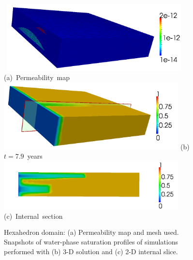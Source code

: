 \begin{figure}[h]
\vbox{
\hbox{
\hspace{-0.cm}\includegraphics[width=0.85\textwidth]{3d_perm}}
\vspace{-0.cm}\hbox{\hspace{4cm}(a) Permeability map}
\vspace{.5cm}
\hbox{
\hspace{-0.cm}\includegraphics[width=0.85\textwidth]{3d_first}}
\vspace{-0.cm}\hbox{\hspace{4cm}(b) $t= 7.9$ years }
\vspace{.5cm}
\hbox{
\hspace{-.cm}\includegraphics[width=0.85\textwidth]{3d_second}}
\vspace{-0.cm}\hbox{\hspace{4cm}(c) Internal section }
}
\caption{Hexahedron domain: (a) Permeability map and mesh used. Snapshots of water-phase saturation profiles of simulations performed with  (b) 3-D solution and (c) 2-D internal slice.\label{fig:3d_perm}}
\end{figure}

